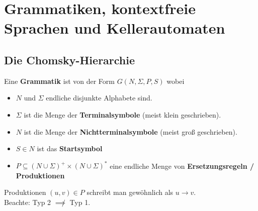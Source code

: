 
\chapter{Grammatiken, kontextfreie Sprachen und Kellerautomaten}

\section{Die Chomsky-Hierarchie}

\begin{definition}\label{def6.2}
	Eine \textbf{Grammatik} ist von der Form $G(N,\Sigma,P,S)$ wobei
	\begin{itemize}
		\item $N$ und $\Sigma$ endliche disjunkte Alphabete sind.
		\item $\Sigma$ ist die Menge der \textbf{Terminalsymbole} (meist klein geschrieben).
		\item $N$ ist die Menge der \textbf{Nichtterminalsymbole} (meist groß geschrieben).
		\item $S\in N$ ist das \textbf{Startsymbol}
		\item $P\subseteq(N\cup\Sigma)^+\times(N\cup\Sigma)^\ast$ eine endliche Menge von \textbf{Ersetzungsregeln / Produktionen}
	\end{itemize}
	Produktionen $(u,v)\in P$ schreibt man gewöhnlich als $u\to v$.\\
	Beachte: Typ 2 $\not\implies$ Typ 1.
\end{definition}

